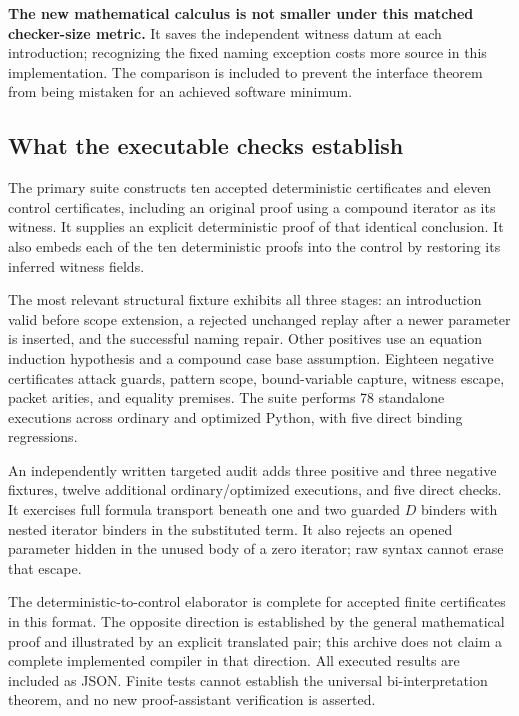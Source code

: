 \documentclass[11pt,letterpaper]{article}
\theoremstyle{definition}\newtheorem{definition}[theorem]{Definition}
\theoremstyle{remark}\newtheorem{remark}[theorem]{Remark}
\begin{document}
\textbf{The new mathematical calculus is not smaller under this matched
checker-size metric.} It saves the independent witness datum at each
introduction; recognizing the fixed naming exception costs more source in
this implementation. The comparison is included to prevent the interface
theorem from being mistaken for an achieved software minimum.

\subsection{What the executable checks establish}

The primary suite constructs ten accepted deterministic certificates and
eleven control certificates, including an original proof using a compound
iterator as its witness. It supplies an explicit deterministic proof of
that identical conclusion. It also embeds each of the ten deterministic
proofs into the control by restoring its inferred witness fields.

The most relevant structural fixture exhibits all three stages:
an introduction valid before scope extension, a rejected unchanged replay
after a newer parameter is inserted, and the successful naming repair.
Other positives use an equation induction hypothesis and a compound case
base assumption. Eighteen negative certificates attack guards, pattern
scope, bound-variable capture, witness escape, packet arities, and equality
premises. The suite performs 78 standalone executions across ordinary and
optimized Python, with five direct binding regressions.

An independently written targeted audit adds three positive and three negative
fixtures, twelve additional ordinary/optimized executions, and five direct
checks. It exercises full formula transport beneath one and two guarded
$D$ binders with nested iterator binders in the substituted term. It also
rejects an opened parameter hidden in the unused body of a zero iterator;
raw syntax cannot erase that escape.

The deterministic-to-control elaborator is complete for accepted finite
certificates in this format. The opposite direction is established by the
general mathematical proof and illustrated by an explicit translated pair;
this archive does not claim a complete implemented compiler in that direction.
All executed results are included as JSON. Finite tests cannot establish the
universal bi-interpretation theorem, and no new proof-assistant verification
is asserted.
\end{document}
